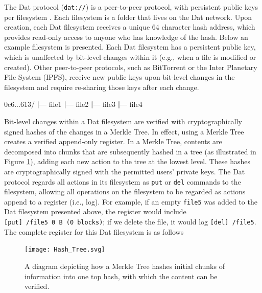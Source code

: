\documentclass[publications,article,submit,moreauthors,pdftex,10pt,a4paper]{Definitions/mdpi}
\newenvironment{Shaded}{\begin{snugshade}}{\end{snugshade}}
\newcommand{\ExtensionTok}[1]{#1}
\newcommand{\KeywordTok}[1]{\textcolor[rgb]{0.13,0.29,0.53}{\textbf{#1}}}
\newcommand{\NormalTok}[1]{#1}
\begin{document}
The Dat protocol (\texttt{dat://}) is a peer-to-peer protocol, with
persistent public keys per filesystem \citep{doi:10.31219/osf.io/nsv2c}. Each filesystem is a
folder that lives on the Dat network. Upon creation, each Dat filesystem
receives a unique 64 character hash address, which provides read-only
access to anyone who has knowledge of the hash. Below an example
filesystem is presented. Each Dat filesystem has a persistent public
key, which is unaffected by bit-level changes within it (e.g., when a
file is modified or created). Other peer-to-peer protocols, such as
BitTorrent or the Inter Planetary File System (IPFS), receive new public
keys upon bit-level changes in the filesystem and require re-sharing
those keys after each change.

\begin{Shaded}
\begin{Highlighting}[]
\ExtensionTok{0c6...613/}
\KeywordTok{|}\ExtensionTok{---}\NormalTok{ file1}
\KeywordTok{|}\ExtensionTok{---}\NormalTok{ file2}
\KeywordTok{|}\ExtensionTok{---}\NormalTok{ file3}
\KeywordTok{|}\ExtensionTok{---}\NormalTok{ file4}
\end{Highlighting}
\end{Shaded}

Bit-level changes within a Dat filesystem are verified with cryptographically signed hashes of the changes in a Merkle Tree. In effect, using a Merkle Tree creates a verified append-only register. In a Merkle Tree, contents are decomposed into chunks that are subsequently hashed in a tree (as illustrated in Figure \ref{fig:datcom-fig2}), adding each new action to the tree at the lowest level. These hashes are cryptographically signed with the permitted users' private keys. The Dat protocol regards all actions in its filesystem as  \texttt{put} or
\texttt{del} commands to the filesystem, allowing all operations on the
filesystem to be regarded as actions append to a register (i.e., log).
For example, if an empty \texttt{file5} was added to the Dat filesystem
presented above, the register would include
\texttt{{[}put{]}\ /file5\ 0\ B\ (0\ blocks)}; if we delete the file, it
would log \texttt{{[}del{]}\ /file5}. The complete register for this Dat
filesystem is as follows

\begin{figure}[!h]

{\centering \texttt{[image: Hash\_Tree.svg]} 

}

\caption{A diagram depicting how a Merkle Tree hashes initial chunks of information into one top hash, with which the content can be verified.}\label{fig:datcom-fig2}
\end{figure}
\end{document}
